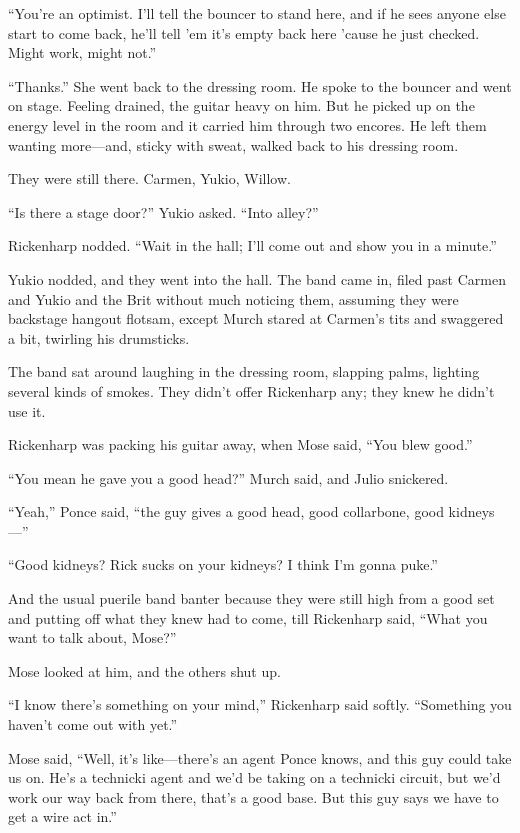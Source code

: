 ``You're an optimist. I'll tell the bouncer to stand here, and if he sees anyone else start to come back, he'll tell 'em it's empty back here 'cause he just checked. Might work, might not.''

``Thanks.'' She went back to the dressing room. He spoke to the bouncer and went on stage. Feeling drained, the guitar heavy on him. But he picked up on the energy level in the room and it carried him through two encores. He left them wanting more—and, sticky with sweat, walked back to his dressing room.

They were still there. Carmen, Yukio, Willow.

``Is there a stage door?'' Yukio asked. ``Into alley?''

Rickenharp nodded. ``Wait in the hall; I'll come out and show you in a minute.''

Yukio nodded, and they went into the hall. The band came in, filed past Carmen and Yukio and the Brit without much noticing them, assuming they were backstage hangout flotsam, except Murch stared at Carmen's tits and swaggered a bit, twirling his drumsticks.

The band sat around laughing in the dressing room, slapping palms, lighting several kinds of smokes. They didn't offer Rickenharp any; they knew he didn't use it.

Rickenharp was packing his guitar away, when Mose said, ``You blew good.''

``You mean he gave you a good head?'' Murch said, and Julio snickered.

``Yeah,'' Ponce said, ``the guy gives a good head, good collarbone, good kidneys—''

``Good kidneys? Rick sucks on your kidneys? I think I'm gonna puke.''

And the usual puerile band banter because they were still high from a good set and putting off what they knew had to come, till Rickenharp said, ``What you want to talk about, Mose?''

Mose looked at him, and the others shut up.

``I know there's something on your mind,'' Rickenharp said softly. ``Something you haven't come out with yet.''

Mose said, ``Well, it's like—there's an agent Ponce knows, and this guy could take us on. He's a technicki agent and we'd be taking on a technicki circuit, but we'd work our way back from there, that's a good base. But this guy says we have to get a wire act in.''

